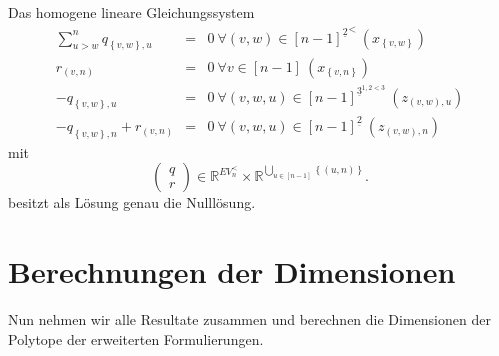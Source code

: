 \documentclass[10p,a4paper,BCOR = 12mm, DIV=15]{scrbook}
\begin{document}
\begin{Le}
\label{le:linearisiert_asymm4_vereinfacht}
Das homogene lineare Gleichungssystem
\begin{eqnarray*}
\sum_{u > w}^n q_{\left\{v, w\right\}, u} & = & 0\ \forall \left(v, w\right)\in {[n-1]^{\underline{2}}}^<\ \left(x_{\left\{v, w\right\}}\right) \\
r_{\left(v, n\right)} & = & 0\ \forall v \in [n-1]\ \left(x_{\left\{v, n\right\}}\right) \\
-q_{\left\{v, w\right\}, u} & = & 0\ \forall \left(v, w, u\right)\in [n-1]^{\underline{3}^{1,2<3}} \ \left(z_{\left(v, w\right), u}\right) \\
-q_{\left\{v, w\right\}, n} + r_{\left(v, n\right)} & = & 0\ \forall \left(v, w, u\right)\in [n-1]^{\underline{2}} \ \left(z_{\left(v, w\right), n}\right)
\end{eqnarray*}
mit
\begin{displaymath}
\left(\begin{array}{c}
q \\
r
\end{array}\right) \in 
\mathbb{R}^{EV_n^{<}}\times \mathbb{R}^{\bigcup_{u \in \left[n-1\right]} \left\{\left(u, n\right)\right\}}.
\end{displaymath}
besitzt als Lösung genau die Nulllösung.
\end{Le}

\section{Berechnungen der Dimensionen}

Nun nehmen wir alle Resultate zusammen und berechnen die Dimensionen der Polytope der erweiterten Formulierungen.
\end{document}
